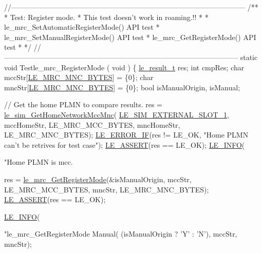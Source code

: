 \begin{DoxyCodeInclude}
\textcolor{comment}{//--------------------------------------------------------------------------------------------------}\textcolor{comment}{}
\textcolor{comment}{/**}
\textcolor{comment}{ * Test: Register mode.}
\textcolor{comment}{ * This test doesn't work in roaming.!!}
\textcolor{comment}{ *}
\textcolor{comment}{ * le\_mrc\_SetAutomaticRegisterMode() API test}
\textcolor{comment}{ * le\_mrc\_SetManualRegisterMode() API test}
\textcolor{comment}{ * le\_mrc\_GetRegisterMode() API test}
\textcolor{comment}{ *}
\textcolor{comment}{ */}
\textcolor{comment}{//--------------------------------------------------------------------------------------------------}
\textcolor{keyword}{static} \textcolor{keywordtype}{void} Testle\_mrc\_RegisterMode
(
    \textcolor{keywordtype}{void}
)
\{
    \hyperlink{le__basics_8h_a1cca095ed6ebab24b57a636382a6c86c}{le\_result\_t} res;
    \textcolor{keywordtype}{int} cmpRes;
    \textcolor{keywordtype}{char} mccStr[\hyperlink{le__mrc__interface_8h_aeae0e240c77730be724ad7ac42596469}{LE\_MRC\_MNC\_BYTES}] = \{0\};
    \textcolor{keywordtype}{char} mncStr[\hyperlink{le__mrc__interface_8h_aeae0e240c77730be724ad7ac42596469}{LE\_MRC\_MNC\_BYTES}] = \{0\};
    \textcolor{keywordtype}{bool} isManualOrigin, isManual;

    \textcolor{comment}{// Get the home PLMN to compare results.}
    res = \hyperlink{le__sim__interface_8h_a6bab381ed34046b553145bfbe53dfa3c}{le\_sim\_GetHomeNetworkMccMnc}(
      \hyperlink{le__sim__interface_8h_aace49df88426119626fb1ef4e544ccdda4270fb44e8fa7876f337864675b42f2d}{LE\_SIM\_EXTERNAL\_SLOT\_1}, mccHomeStr, LE\_MRC\_MCC\_BYTES,
                                      mncHomeStr, LE\_MRC\_MNC\_BYTES);
    \hyperlink{le__log_8h_aceaf11a11691d6c676e36dd317b38dbd}{LE\_ERROR\_IF}(res != LE\_OK, \textcolor{stringliteral}{"Home PLMN can't be retrives for test case"});
    \hyperlink{le__log_8h_ac0dbbef91dc0fed449d0092ff0557b39}{LE\_ASSERT}(res == LE\_OK);
    \hyperlink{le__log_8h_a23e6d206faa64f612045d688cdde5808}{LE\_INFO}(\textcolor{stringliteral}{"Home PLMN is mcc.%

    res = \hyperlink{le__mrc__interface_8h_a9ad2729c28e97ae450f7aee0865197f6}{le\_mrc\_GetRegisterMode}(&isManualOrigin,
                    mccStr, LE\_MRC\_MCC\_BYTES, mncStr, LE\_MRC\_MNC\_BYTES);
    \hyperlink{le__log_8h_ac0dbbef91dc0fed449d0092ff0557b39}{LE\_ASSERT}(res == LE\_OK);

    \hyperlink{le__log_8h_a23e6d206faa64f612045d688cdde5808}{LE\_INFO}(\textcolor{stringliteral}{"le\_mrc\_GetRegisterMode Manual(%
        (isManualOrigin ? \textcolor{charliteral}{'Y'} : \textcolor{charliteral}{'N'}),
        mccStr, mncStr);

}}
\end{DoxyCodeInclude}
